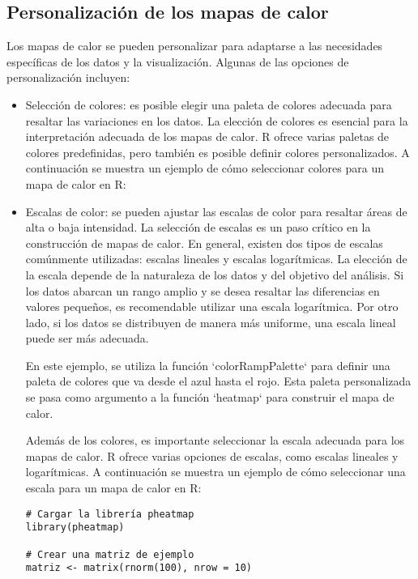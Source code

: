 \documentclass{article}
\begin{document}
\subsection{Personalización de los mapas de calor}
Los mapas de calor se pueden personalizar para adaptarse a las necesidades específicas de los datos y la visualización. Algunas de las opciones de personalización incluyen:

\begin{itemize}
    \item Selección de colores: es posible elegir una paleta de colores adecuada para resaltar las variaciones en los datos. La elección de colores es esencial para la interpretación adecuada de los mapas de calor. R ofrece varias paletas de colores predefinidas, pero también es posible definir colores personalizados. A continuación se muestra un ejemplo de cómo seleccionar colores para un mapa de calor en R:

    
    \item Escalas de color: se pueden ajustar las escalas de color para resaltar áreas de alta o baja intensidad. La selección de escalas es un paso crítico en la construcción de mapas de calor. En general, existen dos tipos de escalas comúnmente utilizadas: escalas lineales y escalas logarítmicas. La elección de la escala depende de la naturaleza de los datos y del objetivo del análisis. Si los datos abarcan un rango amplio y se desea resaltar las diferencias en valores pequeños, es recomendable utilizar una escala logarítmica. Por otro lado, si los datos se distribuyen de manera más uniforme, una escala lineal puede ser más adecuada.


En este ejemplo, se utiliza la función `colorRampPalette` para definir una paleta de colores que va desde el azul hasta el rojo. Esta paleta personalizada se pasa como argumento a la función `heatmap` para construir el mapa de calor.

Además de los colores, es importante seleccionar la escala adecuada para los mapas de calor. R ofrece varias opciones de escalas, como escalas lineales y logarítmicas. A continuación se muestra un ejemplo de cómo seleccionar una escala para un mapa de calor en R:

\begin{verbatim}
# Cargar la librería pheatmap
library(pheatmap)

# Crear una matriz de ejemplo
matriz <- matrix(rnorm(100), nrow = 10)


\end{verbatim}
\end{itemize}
\end{document}
